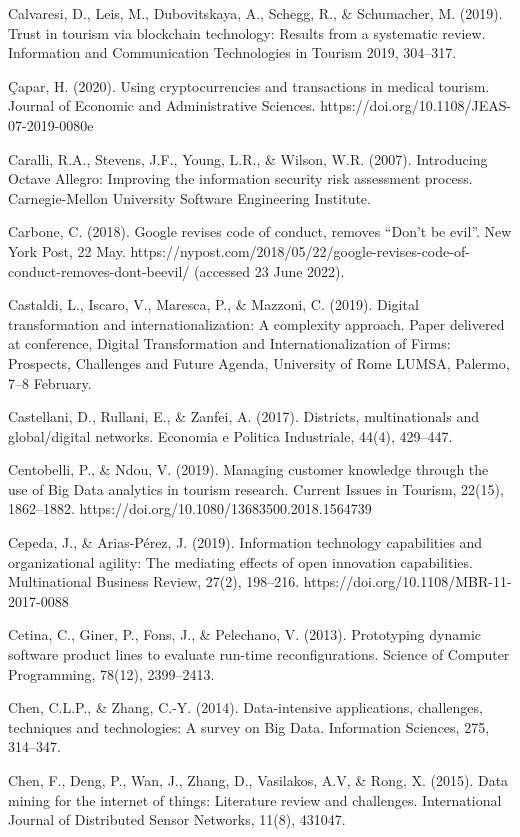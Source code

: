 \documentclass[
  letterpaper,
  DIV=11,
  numbers=noendperiod]{scrreprt}
\begin{document}
Calvaresi, D., Leis, M., Dubovitskaya, A., Schegg, R., \& Schumacher, M.
(2019). Trust in tourism via blockchain technology: Results from a
systematic review. Information and Communication Technologies in Tourism
2019, 304--317.

Çapar, H. (2020). Using cryptocurrencies and transactions in medical
tourism. Journal of Economic and Administrative Sciences.
https://doi.org/10.1108/JEAS-07-2019-0080e

Caralli, R.A., Stevens, J.F., Young, L.R., \& Wilson, W.R. (2007).
Introducing Octave Allegro: Improving the information security risk
assessment process. Carnegie-Mellon University Software Engineering
Institute.

Carbone, C. (2018). Google revises code of conduct, removes ``Don't be
evil''. New York Post, 22 May.
https://nypost.com/2018/05/22/google-revises-code-of-conduct-removes-dont-beevil/
(accessed 23 June 2022).

Castaldi, L., Iscaro, V., Maresca, P., \& Mazzoni, C. (2019). Digital
transformation and internationalization: A complexity approach. Paper
delivered at conference, Digital Transformation and Internationalization
of Firms: Prospects, Challenges and Future Agenda, University of Rome
LUMSA, Palermo, 7--8 February.

Castellani, D., Rullani, E., \& Zanfei, A. (2017). Districts,
multinationals and global/digital networks. Economia e Politica
Industriale, 44(4), 429--447.

Centobelli, P., \& Ndou, V. (2019). Managing customer knowledge through
the use of Big Data analytics in tourism research. Current Issues in
Tourism, 22(15), 1862--1882.
https://doi.org/10.1080/13683500.2018.1564739

Cepeda, J., \& Arias-Pérez, J. (2019). Information technology
capabilities and organizational agility: The mediating effects of open
innovation capabilities. Multinational Business Review, 27(2), 198--216.
https://doi.org/10.1108/MBR-11-2017-0088

Cetina, C., Giner, P., Fons, J., \& Pelechano, V. (2013). Prototyping
dynamic software product lines to evaluate run-time reconfigurations.
Science of Computer Programming, 78(12), 2399--2413.

Chen, C.L.P., \& Zhang, C.-Y. (2014). Data-intensive applications,
challenges, techniques and technologies: A survey on Big Data.
Information Sciences, 275, 314--347.

Chen, F., Deng, P., Wan, J., Zhang, D., Vasilakos, A.V, \& Rong, X.
(2015). Data mining for the internet of things: Literature review and
challenges. International Journal of Distributed Sensor Networks, 11(8),
431047.
\end{document}
